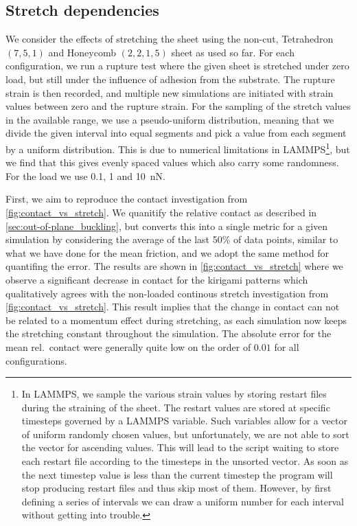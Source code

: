 \subsection{Stretch dependencies}\label{sec:stretch_dependency}
We consider the effects of stretching the sheet using the non-cut, Tetrahedron $(7,5,1)$ and Honeycomb $(2,2,1,5)$ sheet as used so far. For each configuration, we run a rupture test where the given sheet is stretched under zero load, but still under the influence of adhesion from the substrate. The rupture strain is then recorded, and multiple new simulations are initiated with strain values between zero and the rupture strain. For the sampling of the stretch values in the available range, we use a pseudo-uniform distribution, meaning that we divide the given interval into equal segments and pick a value from each segment by a uniform
distribution. This is due to numerical limitations in LAMMPS\footnote{In LAMMPS, we sample the various strain values by storing restart files during the straining of the sheet. The restart values are stored at specific timesteps governed by a LAMMPS variable. Such variables allow for a vector of uniform randomly chosen values, but unfortunately, we are not able to sort the vector for ascending values. This will lead to the script waiting to store each restart file according to the timesteps in the unsorted vector. As soon as the next timestep value is less than the current timestep the program will stop producing restart files and thus skip most of them. However, by first defining a series of intervals we can draw a uniform number for each interval without getting into trouble.}, but we find that this gives evenly spaced values which also carry some randomness. For the load we use 0.1, 1 and \SI{10}{nN}.


First, we aim to reproduce the contact investigation from
\cref{fig:contact_vs_stretch}. We quanitify the relative contact as described in
\cref{sec:out-of-plane_buckling}, but converts this into a single metric for a given simulation by considering the average of the last 50\% of data points, similar
to what we have done for the mean friction, and we adopt the same
method for quantifing the error. The results are shown
in \cref{fig:contact_vs_stretch} where we observe a significant decrease in
contact for the kirigami patterns which qualitatively agrees with the non-loaded
continous stretch investigation from \cref{fig:contact_vs_stretch}. This result implies that the change in contact can not be related to a momentum effect during stretching, as each simulation now keeps the stretching constant throughout the simulation. The absolute error for the
mean rel.\ contact were generally quite low on the order of $0.01$ for all configurations. 

